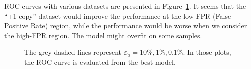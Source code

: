 \documentclass[12pt]{article}
\begin{document}
			ROC curves with various datasets are presented in Figure~\ref{fig:roc_curve_res_25_75}. It seems that the ``+1 copy'' dataset would improve the performance at the low-FPR (False Positive Rate) region, while the performance would be worse when we consider the high-FPR region. The model might overfit on some samples.
			\begin{figure}[htpb]
				\centering
				\caption{The grey dashed lines represent $\varepsilon_{\text{b}}=10 \%, 1 \%, 0.1\%$. In those plots, the ROC curve is evaluated from the best model.}
				\label{fig:roc_curve_res_25_75}
			\end{figure}
\end{document}
